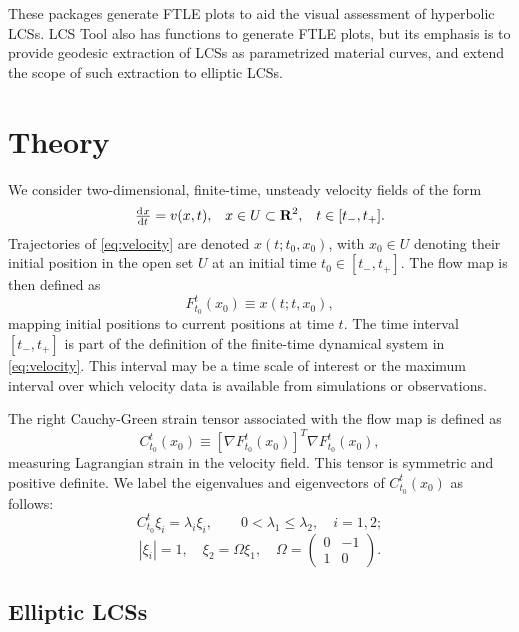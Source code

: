 \documentclass{article}
\begin{document}
These packages generate FTLE plots to aid the visual assessment of hyperbolic LCSs.
LCS Tool also has functions to generate FTLE plots, but its emphasis is to provide geodesic extraction of LCSs as parametrized material curves, and extend the scope of such extraction to elliptic LCSs.

\section{Theory}

We consider two-dimensional, finite-time, unsteady velocity fields of the form
\begin{align}
\od{x}{t} = v(x,t), && x \in U \subset \mathbf R^2, && t \in [t_-,t_+].
\label{eq:velocity}
\end{align}
Trajectories of \cref{eq:velocity} are denoted $x(t;t_0,x_0)$, with $x_0 \in U$ denoting their initial position in the open set $U$ at an initial time $t_0 \in [t_-,t_+]$. The flow map is then defined as
\[
F_{t_0}^t(x_0) \equiv x(t;t,x_0),
\]
mapping initial positions to current positions at time $t$. The time interval $[t_-,t_+]$ is part of the definition of the finite-time dynamical system in \cref{eq:velocity}. This interval may be a time scale of interest or the maximum interval over which velocity data is available from simulations or observations.

The right Cauchy-Green strain tensor associated with the flow map is defined as
\begin{equation}
C_{t_0}^t(x_0) \equiv \left[\nabla F_{t_0}^t(x_0)\right]^T \nabla F_{t_0}^t(x_0),
\label{eq:CG}
\end{equation}
measuring Lagrangian strain in the velocity field. This tensor is symmetric and positive definite\parencite{truesdell04}. We label the eigenvalues and eigenvectors of $C_{t_0}^t(x_0)$ as follows:
\[
C_{t_0}^t \xi_i = \lambda_i \xi_i, \qquad 0 < \lambda_1 \leq \lambda_2, \quad i = 1,2;
\]
\begin{equation}
\left|\xi_i\right| = 1, \quad \xi_2 = \Omega \xi_1, \quad \Omega = \left(
\begin{array}{rr}
0 & -1\\
1 & 0
\end{array}
\right).
\label{eq:CG_invariants}
\end{equation}

\subsection{Elliptic LCSs}
\label{s:Elliptic LCSs}
\end{document}
